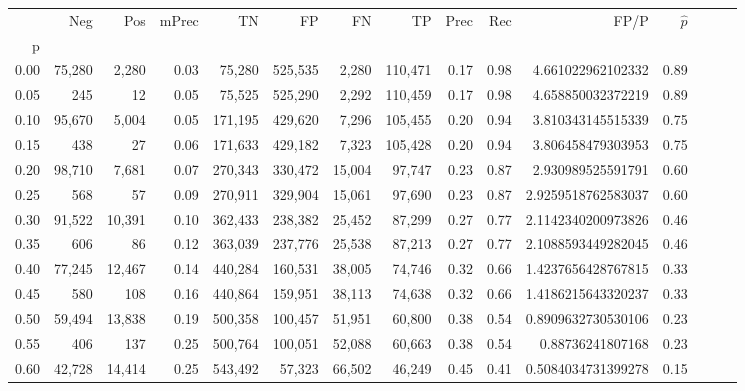 \begin{tabular}{rrrrrrrrrrrrrrr}
\toprule
{} &     Neg &     Pos & mPrec &       TN &       FP &       FN &       TP &  Prec &   Rec &                 FP/P & $\hat{p}$ \\
p    &         &         &       &          &          &          &          &       &       &                      &           \\
\midrule
0.00 &  75,280 &   2,280 &  0.03 &   75,280 &  525,535 &    2,280 &  110,471 &  0.17 &  0.98 &    4.661022962102332 &      0.89 \\
0.05 &     245 &      12 &  0.05 &   75,525 &  525,290 &    2,292 &  110,459 &  0.17 &  0.98 &    4.658850032372219 &      0.89 \\
0.10 &  95,670 &   5,004 &  0.05 &  171,195 &  429,620 &    7,296 &  105,455 &  0.20 &  0.94 &    3.810343145515339 &      0.75 \\
0.15 &     438 &      27 &  0.06 &  171,633 &  429,182 &    7,323 &  105,428 &  0.20 &  0.94 &    3.806458479303953 &      0.75 \\
0.20 &  98,710 &   7,681 &  0.07 &  270,343 &  330,472 &   15,004 &   97,747 &  0.23 &  0.87 &    2.930989525591791 &      0.60 \\
0.25 &     568 &      57 &  0.09 &  270,911 &  329,904 &   15,061 &   97,690 &  0.23 &  0.87 &   2.9259518762583037 &      0.60 \\
0.30 &  91,522 &  10,391 &  0.10 &  362,433 &  238,382 &   25,452 &   87,299 &  0.27 &  0.77 &   2.1142340200973826 &      0.46 \\
0.35 &     606 &      86 &  0.12 &  363,039 &  237,776 &   25,538 &   87,213 &  0.27 &  0.77 &   2.1088593449282045 &      0.46 \\
0.40 &  77,245 &  12,467 &  0.14 &  440,284 &  160,531 &   38,005 &   74,746 &  0.32 &  0.66 &   1.4237656428767815 &      0.33 \\
0.45 &     580 &     108 &  0.16 &  440,864 &  159,951 &   38,113 &   74,638 &  0.32 &  0.66 &   1.4186215643320237 &      0.33 \\
0.50 &  59,494 &  13,838 &  0.19 &  500,358 &  100,457 &   51,951 &   60,800 &  0.38 &  0.54 &   0.8909632730530106 &      0.23 \\
0.55 &     406 &     137 &  0.25 &  500,764 &  100,051 &   52,088 &   60,663 &  0.38 &  0.54 &     0.88736241807168 &      0.23 \\
0.60 &  42,728 &  14,414 &  0.25 &  543,492 &   57,323 &   66,502 &   46,249 &  0.45 &  0.41 &   0.5084034731399278 &      0.15 \\

\end{tabular}
